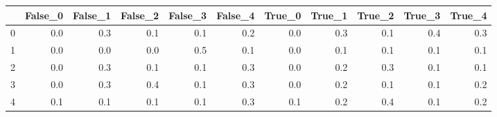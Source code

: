 \begin{tabular}{lrrrrrrrrrr}
\toprule
{} &  False\_0 &  False\_1 &  False\_2 &  False\_3 &  False\_4 &  True\_0 &  True\_1 &  True\_2 &  True\_3 &  True\_4 \\ \hline
\midrule
0 &      0.0 &      0.3 &      0.1 &      0.1 &      0.2 &     0.0 &     0.3 &     0.1 &     0.4 &     0.3 \\ \hline
1 &      0.0 &      0.0 &      0.0 &      0.5 &      0.1 &     0.0 &     0.1 &     0.1 &     0.1 &     0.1 \\ \hline
2 &      0.0 &      0.3 &      0.1 &      0.1 &      0.3 &     0.0 &     0.2 &     0.3 &     0.1 &     0.1 \\ \hline
3 &      0.0 &      0.3 &      0.4 &      0.1 &      0.3 &     0.0 &     0.2 &     0.1 &     0.1 &     0.2 \\ \hline
4 &      0.1 &      0.1 &      0.1 &      0.1 &      0.3 &     0.1 &     0.2 &     0.4 &     0.1 &     0.2 \\ \hline
\bottomrule
\end{tabular}
